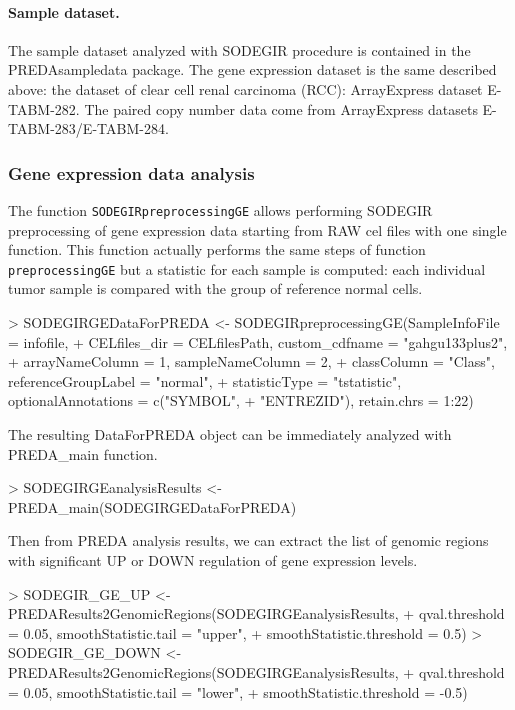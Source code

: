 \documentclass[a4paper,10pt]{article}
\begin{document}
\paragraph{Sample dataset.} The sample dataset analyzed with SODEGIR procedure is contained in the PREDAsampledata package.
The gene expression dataset is the same described above: the dataset of clear cell renal carcinoma (RCC): ArrayExpress dataset E-TABM-282. The paired copy number data come from ArrayExpress datasets E-TABM-283/E-TABM-284.


\subsubsection{Gene expression data analysis}
The function \texttt{SODEGIRpreprocessingGE} allows performing SODEGIR preprocessing of gene expression data starting from RAW cel files with one single function. This function actually performs the same steps of function \texttt{preprocessingGE} but a statistic for each sample is computed: each individual tumor sample is compared with the group of reference normal cells.

\begin{Schunk}
\begin{Sinput}
> SODEGIRGEDataForPREDA <- SODEGIRpreprocessingGE(SampleInfoFile = infofile, 
+     CELfiles_dir = CELfilesPath, custom_cdfname = "gahgu133plus2", 
+     arrayNameColumn = 1, sampleNameColumn = 2, 
+     classColumn = "Class", referenceGroupLabel = "normal", 
+     statisticType = "tstatistic", optionalAnnotations = c("SYMBOL", 
+         "ENTREZID"), retain.chrs = 1:22)
\end{Sinput}
\end{Schunk}

The resulting DataForPREDA object can be immediately analyzed with PREDA\_main function.

\begin{Schunk}
\begin{Sinput}
> SODEGIRGEanalysisResults <- PREDA_main(SODEGIRGEDataForPREDA)
\end{Sinput}
\end{Schunk}


Then from PREDA analysis results, we can extract the list of genomic regions with significant UP or DOWN regulation of gene expression levels.

\begin{Schunk}
\begin{Sinput}
> SODEGIR_GE_UP <- PREDAResults2GenomicRegions(SODEGIRGEanalysisResults, 
+     qval.threshold = 0.05, smoothStatistic.tail = "upper", 
+     smoothStatistic.threshold = 0.5)
> SODEGIR_GE_DOWN <- PREDAResults2GenomicRegions(SODEGIRGEanalysisResults, 
+     qval.threshold = 0.05, smoothStatistic.tail = "lower", 
+     smoothStatistic.threshold = -0.5)
\end{Sinput}
\end{Schunk}
\end{document}
